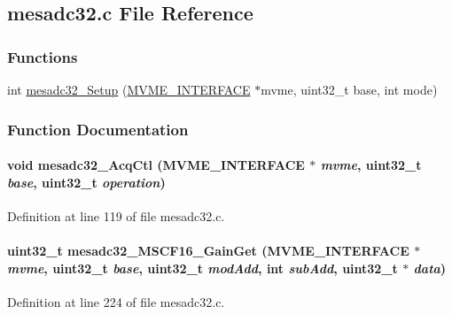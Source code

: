 \subsection{mesadc32.c File Reference}
\label{mesadc32_8c}
\subsubsection*{Functions}
\begin{DoxyCompactItemize}
\item 
int \hyperlink{mesadc32_8c_a3855ed86c6719a64b67b0e3ee8db64f7}{mesadc32\_\-Setup} (\hyperlink{structMVME__INTERFACE}{MVME\_\-INTERFACE} $\ast$mvme, uint32\_\-t base, int mode)
\end{DoxyCompactItemize}


\subsubsection{Function Documentation}
\paragraph[{mesadc32\_\-AcqCtl}]{\setlength{\rightskip}{0pt plus 5cm}void mesadc32\_\-AcqCtl ({\bf MVME\_\-INTERFACE} $\ast$ {\em mvme}, \/  uint32\_\-t {\em base}, \/  uint32\_\-t {\em operation})}\hfill\label{mesadc32_8c_af7456de5aa94cd5b078a9d24be5dd1ef}


Definition at line 119 of file mesadc32.c.
\paragraph[{mesadc32\_\-MSCF16\_\-GainGet}]{\setlength{\rightskip}{0pt plus 5cm}uint32\_\-t mesadc32\_\-MSCF16\_\-GainGet ({\bf MVME\_\-INTERFACE} $\ast$ {\em mvme}, \/  uint32\_\-t {\em base}, \/  uint32\_\-t {\em modAdd}, \/  int {\em subAdd}, \/  uint32\_\-t $\ast$ {\em data})}\hfill\label{mesadc32_8c_ab6ec3e84f7070736d8e848ef51b5cd0d}


Definition at line 224 of file mesadc32.c.
